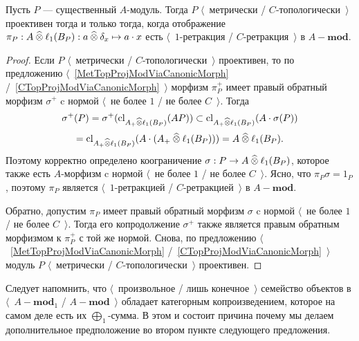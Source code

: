 \begin{proposition}\label{NonDegenMetTopProjCharac} Пусть $P$ --- существенный
$A$-модуль. Тогда $P$ $\langle$~метрически / $C$-топологически~$\rangle$
проективен тогда и только тогда, когда отображение
$\pi_P:A\mathbin{\widehat{\otimes}}\ell_1(B_P):a\mathbin{\widehat{\otimes}}\delta_x\mapsto a\cdot x$ есть
$\langle$~$1$-ретракция / $C$-ретракция~$\rangle$ в $A-\mathbf{mod}$.
\end{proposition} 
\begin{proof}
Если $P$ $\langle$~метрически / $C$-топологически~$\rangle$ проективен, то по
предложению  $\langle$~\ref{MetTopProjModViaCanonicMorph}
/~\ref{CTopProjModViaCanonicMorph}~$\rangle$ морфизм $\pi_P^+$ имеет правый
обратный морфизм $\sigma^+$ c нормой $\langle$~не более $1$ / не более
$C$~$\rangle$. Тогда 
$$
\sigma^+(P)
=\sigma^+(\operatorname{cl}_{A_+\mathbin{\widehat{\otimes}}\ell_1(B_P)}(AP))
\subset \operatorname{cl}_{A_+\mathbin{\widehat{\otimes}}\ell_1(B_P)}(A\cdot\sigma(P))
$$
$$
=\operatorname{cl}_{A_+\mathbin{\widehat{\otimes}}\ell_1(B_P)}(A\cdot(A_+\mathbin{\widehat{\otimes}}\ell_1(B_P)))
=A\mathbin{\widehat{\otimes}}\ell_1(B_P).
$$
Поэтому корректно определено коограничение $\sigma:P\to A\mathbin{\widehat{\otimes}}\ell_1(B_P)$,
которое также есть $A$-морфизм c нормой $\langle$~не более $1$ / не более
$C$~$\rangle$. Ясно, что $\pi_P\sigma=1_P$, поэтому $\pi_P$ является
$\langle$~$1$-ретракцией / $C$-ретракцией~$\rangle$ в $A-\mathbf{mod}$.

Обратно, допустим $\pi_P$ имеет правый обратный морфизм $\sigma$ c нормой
$\langle$~не более $1$ / не более $C$~$\rangle$. Тогда его копродолжение
$\sigma^+$ также является правым обратным морфизмом к $\pi_P^+$ с той же нормой.
Снова, по предложению $\langle$~\ref{MetTopProjModViaCanonicMorph}
/~\ref{CTopProjModViaCanonicMorph}~$\rangle$ модуль $P$ $\langle$~метрически /
$C$-топологически~$\rangle$ проективен. 
\end{proof}

Следует напомнить, что $\langle$~произвольное / лишь конечное~$\rangle$
семейство объектов в $\langle$~$A-\mathbf{mod}_1$ / $A-\mathbf{mod}$~$\rangle$
обладает категорным копроизведением, которое на самом деле есть их
$\bigoplus_1$-сумма. В этом и состоит причина почему мы делаем дополнительное
предположение во втором пункте следующего предложения.

